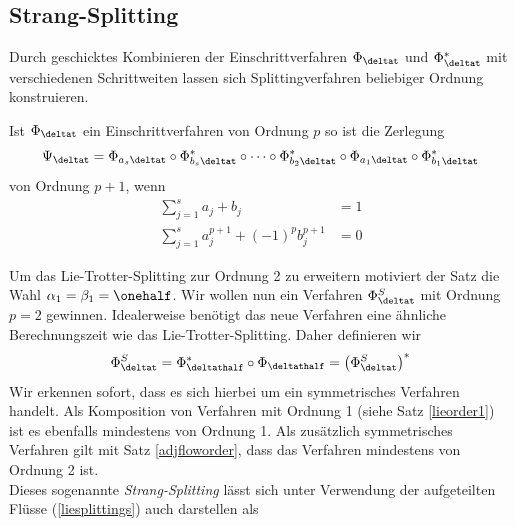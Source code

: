 \subsection{Strang-Splitting}
\label{secstrang}
Durch geschicktes Kombinieren der Einschrittverfahren $\Phi_{\deltat}$ und $\Phi_{\deltat}^*$ mit verschiedenen Schrittweiten lassen sich Splittingverfahren beliebiger Ordnung konstruieren.
\begin{maththeorem}
Ist $\Phi_{\deltat}$ ein Einschrittverfahren von Ordnung $p$ so ist die Zerlegung
\[\Psi_{\deltat}=\Phi_{a_s\deltat}\circ \Phi_{b_s\deltat}^*\circ\dots\circ\Phi_{b_2\deltat}^*\circ\Phi_{a_1\deltat}\circ\Phi_{b_1\deltat}^*\]
von Ordnung $p+1$, wenn 
\begin{align*}
\sum_{j=1}^sa_j+b_j&=1\\
\sum_{j=1}^sa_j^{p+1}+(-1)^pb_j^{p+1}&=0
\end{align*}
\end{maththeorem}
Um das Lie-Trotter-Splitting zur Ordnung 2 zu erweitern motiviert der Satz die Wahl $\alpha_1=\beta_1=\onehalf$. Wir wollen nun ein Verfahren $\Phi_{\deltat}^S$ mit Ordnung $p=2$ gewinnen. Idealerweise benötigt das neue Verfahren eine ähnliche Berechnungszeit wie das Lie-Trotter-Splitting. Daher definieren wir
\[\Phi_{\deltat}^S=\Phi_{\deltathalf}^*\circ\Phi_{\deltathalf}=\left(\Phi_{\deltat}^S\right)^*\]
Wir erkennen sofort, dass es sich hierbei um ein symmetrisches Verfahren handelt. Als Komposition von Verfahren mit Ordnung 1 (siehe Satz \ref{lieorder1}) ist es ebenfalls mindestens von Ordnung 1. Als zusätzlich symmetrisches Verfahren gilt mit Satz \ref{adjfloworder}, dass das Verfahren mindestens von Ordnung 2 ist.\\
Dieses sogenannte \emph{Strang-Splitting} lässt sich unter Verwendung der aufgeteilten Flüsse (\ref{liesplittings}) auch darstellen als 

